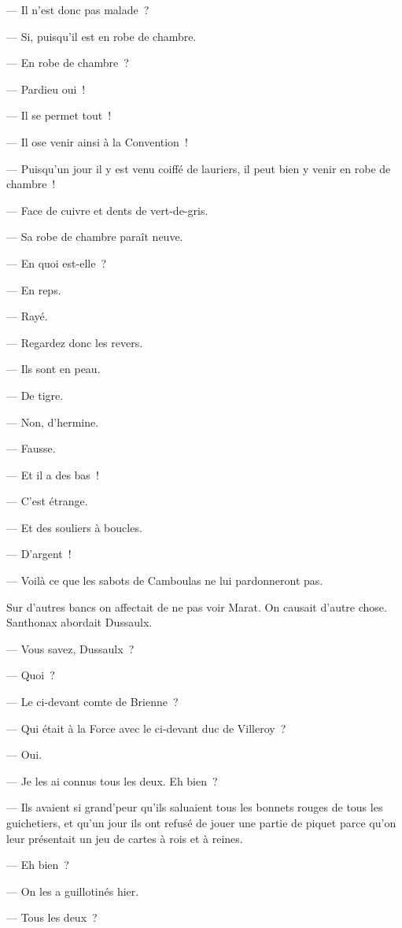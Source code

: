 \documentclass[french,twoside]{book} %
\begin{document}
— Il n’est donc pas malade ?\par
— Si, puisqu’il est en robe de chambre.\par
— En robe de chambre ?\par
— Pardieu oui !\par
— Il se permet tout !\par
— Il ose venir ainsi à la Convention !\par
— Puisqu’un jour il y est venu coiffé de lauriers, il peut bien y venir en robe de chambre !\par
— Face de cuivre et dents de vert-de-gris.\par
— Sa robe de chambre paraît neuve.\par
— En quoi est-elle ?\par
— En reps.\par
— Rayé.\par
 — Regardez donc les revers.\par
— Ils sont en peau.\par
— De tigre.\par
— Non, d’hermine.\par
— Fausse.\par
— Et il a des bas !\par
— C’est étrange.\par
— Et des souliers à boucles.\par
— D’argent !\par
— Voilà ce que les sabots de Camboulas ne lui pardonneront pas.\par
Sur d’autres bancs on affectait de ne pas voir Marat. On causait d’autre chose. Santhonax abordait Dussaulx.\par
— Vous savez, Dussaulx ?\par
— Quoi ?\par
— Le ci-devant comte de Brienne ?\par
— Qui était à la Force avec le ci-devant duc de Villeroy ?\par
— Oui.\par
— Je les ai connus tous les deux. Eh bien ?\par
— Ils avaient si grand’peur qu’ils saluaient tous les bonnets rouges de tous les guichetiers, et qu’un jour ils ont refusé de jouer une partie de piquet parce qu’on leur présentait un jeu de cartes à rois et à reines.\par
— Eh bien ?\par
— On les a guillotinés hier.\par
— Tous les deux ?\par
\end{document}
